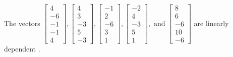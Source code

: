 \begin{exercise}
\begin{exerciseStatement}
  \end{exerciseStatement}
  \begin{exerciseAnswer}
   The vectors \(\left[\begin{array}{r}
4 \\
-6 \\
-1 \\
-1 \\
4
\end{array}\right] , \left[\begin{array}{r}
4 \\
3 \\
-3 \\
5 \\
-3
\end{array}\right] , \left[\begin{array}{r}
-1 \\
2 \\
-6 \\
3 \\
1
\end{array}\right] , \left[\begin{array}{r}
-2 \\
4 \\
-3 \\
5 \\
1
\end{array}\right] , \text{ and } \left[\begin{array}{r}
8 \\
6 \\
-6 \\
10 \\
-6
\end{array}\right]\) are 
  	 linearly dependent  .
  


  \end{exerciseAnswer}
\end{exercise}